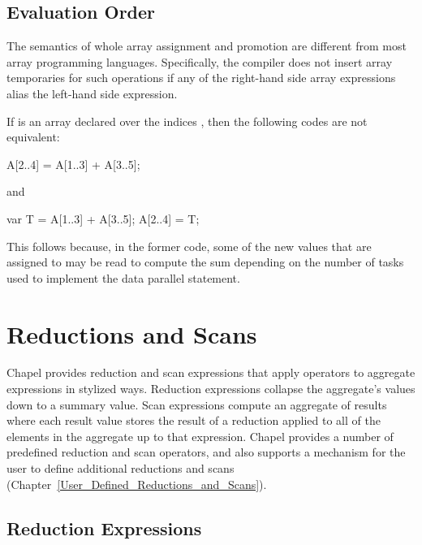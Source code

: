 \subsection{Evaluation Order}
\label{Evaluation_Order}
The semantics of whole array assignment and promotion are different
from most array programming languages.  Specifically, the compiler
does not insert array temporaries for such operations if any of the
right-hand side array expressions alias the left-hand side expression.

%
%
\begin{example}
If  is an array declared over the indices , then
the following codes are not equivalent:
\begin{chapel}
A[2..4] = A[1..3] + A[3..5];
\end{chapel}
and
\begin{chapel}
var T = A[1..3] + A[3..5];
A[2..4] = T;
\end{chapel}
This follows because, in the former code, some of the new values that
are assigned to  may be read to compute the sum depending on
the number of tasks used to implement the data parallel statement.
\end{example}



\section{Reductions and Scans}
\label{Reductions_and_Scans}

Chapel provides reduction and scan expressions that apply operators to
aggregate expressions in stylized ways.  Reduction expressions
collapse the aggregate's values down to a summary value.  Scan
expressions compute an aggregate of results where each result value
stores the result of a reduction applied to all of the elements in the
aggregate up to that expression.  Chapel provides a number of predefined
reduction and scan operators, and also supports a mechanism for the
user to define additional reductions and
scans (Chapter~\ref{User_Defined_Reductions_and_Scans}).

\subsection{Reduction Expressions}
\label{reduce}

